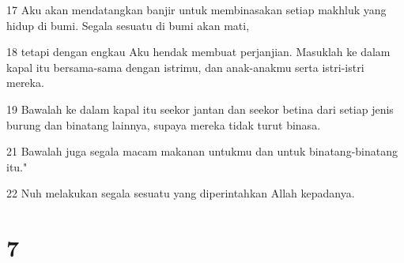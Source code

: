 \par 17 Aku akan mendatangkan banjir untuk membinasakan setiap makhluk yang hidup di bumi. Segala sesuatu di bumi akan mati,
\par 18 tetapi dengan engkau Aku hendak membuat perjanjian. Masuklah ke dalam kapal itu bersama-sama dengan istrimu, dan anak-anakmu serta istri-istri mereka.
\par 19 Bawalah ke dalam kapal itu seekor jantan dan seekor betina dari setiap jenis burung dan binatang lainnya, supaya mereka tidak turut binasa.
\par 21 Bawalah juga segala macam makanan untukmu dan untuk binatang-binatang itu."
\par 22 Nuh melakukan segala sesuatu yang diperintahkan Allah kepadanya.

\chapter{7}

